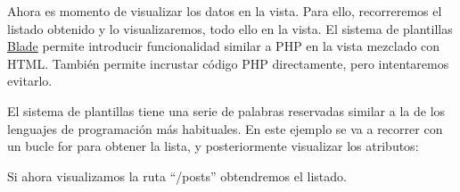
Ahora es momento de visualizar los datos en la vista. Para ello, recorreremos el listado obtenido y lo visualizaremos, todo ello en la vista. El sistema de plantillas \href{https://laravel.com/docs/10.x/blade}{Blade} permite introducir funcionalidad similar a PHP en la vista mezclado con HTML. También permite incrustar código PHP directamente, pero intentaremos evitarlo.

El sistema de plantillas tiene una serie de palabras reservadas similar a la de los lenguajes de programación más habituales. En este ejemplo se va a recorrer con un bucle for para obtener la lista, y posteriormente visualizar los atributos:


Si ahora visualizamos la ruta “/posts” obtendremos el listado.

